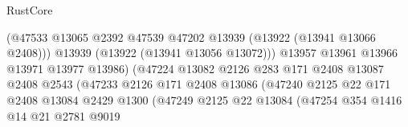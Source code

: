 \begin{lexlean}{RustCore}
\begin{coremodule}
                                              (@47533
                                                @13065
                                                @2392
                                                @47539
                                                @47202
                                                @13939
                                                (@13922 (@13941 @13066 @2408)))
                                              @13939
                                              (@13922 (@13941 @13056 @13072)))
                                            @13957
                                            @13961
                                            @13966
                                            @13971
                                            @13977
                                            @13986)
                                          (@47224
                                            @13082
                                            @2126
                                            @283
                                            @171
                                            @2408
                                            @13087
                                            @2408
                                            @2543
                                            (@47233
                                              @2126
                                              @171
                                              @2408
                                              @13086
                                              (@47240
                                                @2125
                                                @22
                                                @171
                                                @2408
                                                @13084
                                                @2429
                                                @1300
                                                (@47249
                                                  @2125
                                                  @22
                                                  @13084
                                                  (@47254
                                                    @354
                                                    @1416
                                                    @14
                                                    @21
                                                    @2781
                                                    @9019

\end{coremodule}
\end{lexlean}
